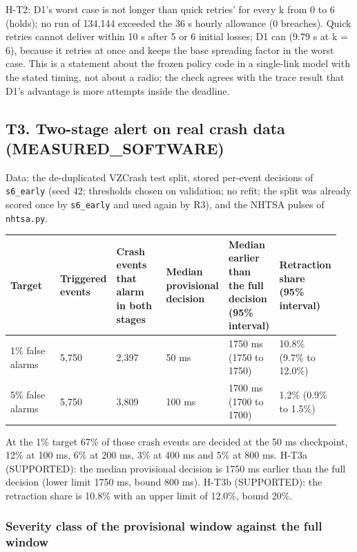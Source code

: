 H-T2: D1's worst case is not longer than quick retries' for every k from 0 to 6 (holds); no run of 134,144 exceeded the 36 s hourly allowance (0 breaches). Quick retries cannot deliver within 10 s after 5 or 6 initial losses; D1 can (9.79 s at k = 6), because it retries at once and keeps the base spreading factor in the worst case. This is a statement about the frozen policy code in a single-link model with the stated timing, not about a radio; the check agrees with the trace result that D1's advantage is more attempts inside the deadline.

\subsection*{T3. Two-stage alert on real crash data (MEASURED\_SOFTWARE)}

Data: the de-duplicated VZCrash test split, stored per-event decisions of \texttt{s6\_early} (seed 42; thresholds chosen on validation; no refit; the split was already scored once by \texttt{s6\_early} and used again by R3), and the NHTSA pulses of \texttt{nhtsa.py}.

{\scriptsize\raggedright
\begin{longtable}{p{0.158\linewidth}p{0.158\linewidth}p{0.158\linewidth}p{0.158\linewidth}p{0.158\linewidth}p{0.158\linewidth}}
\toprule
Target & Triggered events & Crash events that alarm in both stages & Median provisional decision & Median earlier than the full decision (95\% interval) & Retraction share (95\% interval) \\
\midrule
\endhead
1\% false alarms & 5,750 & 2,397 & 50 ms & 1750 ms (1750 to 1750) & 10.8\% (9.7\% to 12.0\%) \\
5\% false alarms & 5,750 & 3,809 & 100 ms & 1700 ms (1700 to 1700) & 1.2\% (0.9\% to 1.5\%) \\
\bottomrule
\end{longtable}}

At the 1\% target 67\% of those crash events are decided at the 50 ms checkpoint, 12\% at 100 ms, 6\% at 200 ms, 3\% at 400 ms and 5\% at 800 ms. H-T3a (SUPPORTED): the median provisional decision is 1750 ms earlier than the full decision (lower limit 1750 ms, bound 800 ms). H-T3b (SUPPORTED): the retraction share is 10.8\% with an upper limit of 12.0\%, bound 20\%.

\subsubsection*{Severity class of the provisional window against the full window}

